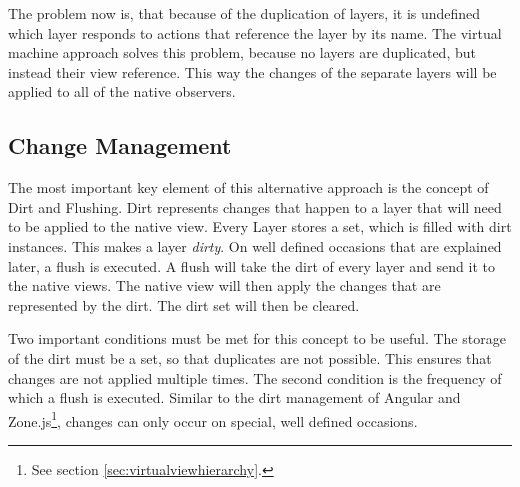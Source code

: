 The problem now is, that because of the duplication of layers, it is undefined which layer responds to actions that reference the layer by its name.
The virtual machine approach solves this problem, because no layers are duplicated, but instead their view reference.
This way the changes of the separate layers will be applied to all of the native observers.

\subsection{Change Management}
\label{sec:changemanagement}

The most important key element of this alternative approach is the concept of Dirt and Flushing.
Dirt represents changes that happen to a layer that will need to be applied to the native view.
Every Layer stores a set, which is filled with dirt instances.
This makes a layer \textit{dirty}.
On well defined occasions that are explained later, a flush is executed.
A flush will take the dirt of every layer and send it to the native views.
The native view will then apply the changes that are represented by the dirt.
The dirt set will then be cleared.

Two important conditions must be met for this concept to be useful.
The storage of the dirt must be a set, so that duplicates are not possible.
This ensures that changes are not applied multiple times.
The second condition is the frequency of which a flush is executed.
Similar to the dirt management of Angular and Zone.js\footnote{See section \ref{sec:virtualviewhierarchy}.}, changes can only occur on special, well defined occasions.


